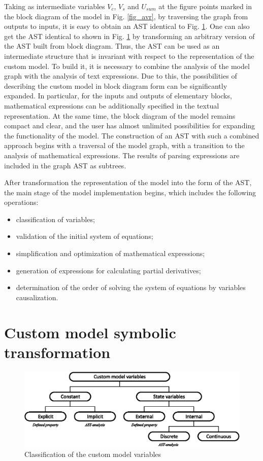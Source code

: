 \documentclass[lettersize,journal]{IEEEtran}
\begin{document}
Taking as intermediate variables \(V_{c}\), \(V_{s}\) and \(U_{sum} \) at the figure points marked in the block diagram
of the model in Fig. \ref{fig_avr}, by traversing the graph from outputs to inputs, it is easy to obtain an AST 
identical to Fig. \ref{fig_ast}. One can also get the AST identical to shown in Fig. \ref{fig_ast} by transforming 
an arbitrary version of the AST built from block diagram. Thus, the AST can be used as an intermediate structure 
that is invariant with respect to the representation of the custom model. To build it, it is necessary to combine 
the analysis of the model graph with the analysis of text expressions. Due to this, the possibilities of describing 
the custom model in block diagram form can be significantly expanded. In particular, for the inputs and outputs 
of elementary blocks, mathematical expressions can be additionally specified in the textual representation. 
At the same time, the block diagram of the model remains compact and clear, and the user has almost unlimited 
possibilities for expanding the functionality of the model. The construction of an AST with such a combined approach 
begins with a traversal of the model graph, with a transition to the analysis of mathematical expressions. The results 
of parsing expressions are included in the graph AST as subtrees.

After transformation the representation of the model into the form of the AST, the main stage of the model implementation begins, which includes the following operations:
\begin{itemize}
	\item classification of variables;
	\item validation of the initial system of equations;
	\item simplification and optimization of mathematical expressions;
	\item generation of expressions for calculating partial derivatives;
	\item determination of the order of solving the system of equations by variables causalization.
\end{itemize}

\section{Custom model symbolic transformation}


\begin{figure}[h]
	\centering
	\includegraphics[width=\columnwidth]{variables.eps}
	\caption{Classification of the custom model variables}
	\label{fig_ast}
\end{figure}
\end{document}
